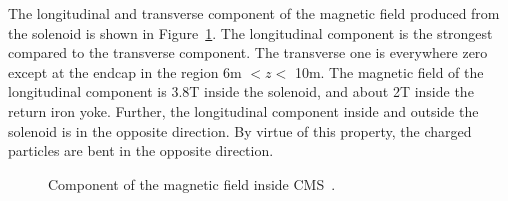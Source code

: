 The longitudinal and transverse component of the magnetic field produced from 
the solenoid is shown in Figure~\ref{fig:cms_mag}. The longitudinal component
is the strongest compared to the transverse component. The transverse one
 is everywhere zero except at the endcap in the region 6\unit{m} $<z<$ 10\unit{m}. 
The magnetic field of the longitudinal component is 3.8\unit{T} inside the solenoid,
and about 2\unit{T} inside the return iron yoke. Further, the longitudinal component
inside and outside the solenoid is in the opposite direction. By virtue of this property, 
the charged particles are bent in the opposite direction.
\begin{figure}
  \centering
  \hfil
	\caption{Component of the magnetic field inside CMS~\cite{Lenzi:2013xpa}.}
  \label{fig:cms_mag}
\end{figure}

